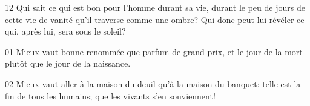 
12 Qui sait ce qui est bon pour l’homme durant sa vie, durant le peu de jours de cette vie de vanité qu’il traverse comme une ombre? Qui donc peut lui révéler ce qui, après lui, sera sous le soleil?

01 Mieux vaut bonne renommée que parfum de grand prix, et le jour de la mort plutôt que le jour de la naissance.

02 Mieux vaut aller à la maison du deuil qu’à la maison du banquet: telle est la fin de tous les humains; que les vivants s’en souviennent!

